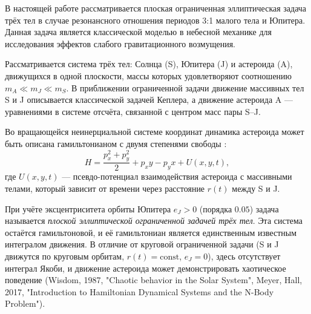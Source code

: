В настоящей работе рассматривается плоская ограниченная эллиптическая задача трёх тел в случае резонансного отношения периодов 3:1 малого тела и Юпитера. Данная задача является классической моделью в небесной механике для исследования эффектов слабого гравитационного возмущения.

Рассматривается система трёх тел: Солнца (S), Юпитера (J) и астероида (A), движущихся в одной плоскости, массы которых удовлетворяют 
соотношению $m_A \ll m_J \ll m_S$. В приближении ограниченной задачи движение массивных тел S и J описывается 
классической задачей Кеплера, а движение астероида A — уравнениями в системе отсчёта, связанной с центром масс пары S–J.   

Во вращающейся неинерциальной системе координат динамика астероида может быть описана гамильтонианом с двумя степенями свободы \cite{MurrayDermott}:
\[
H = \frac{p_x^2 + p_y^2}{2} + p_x y - p_y x + U(x,y,t),
\]
где $U(x,y,t)$ — псевдо-потенциал взаимодействия астероида с массивными телами, который зависит от времени через расстояние $r(t)$ между S и J.  

При учёте эксцентриситета орбиты Юпитера $e_J > 0$ (порядка $0.05$) задача называется 
\emph{плоской эллиптической ограниченной задачей трёх тел}. Эта система остаётся гамильтоновой, и её гамильтониан  
является единственным известным интегралом движения. В отличие от круговой ограниченной задачи (S и J движутся по круговым орбитам, $r(t)=\text{const}$, $e_J=0$), здесь отсутствует интеграл Якоби, и движение астероида может демонстрировать хаотическое поведение (Wisdom, 1987, "Chaotic behavior in the Solar System", Meyer, Hall, 2017, "Introduction to Hamiltonian Dynamical Systems and the N-Body Problem").  

